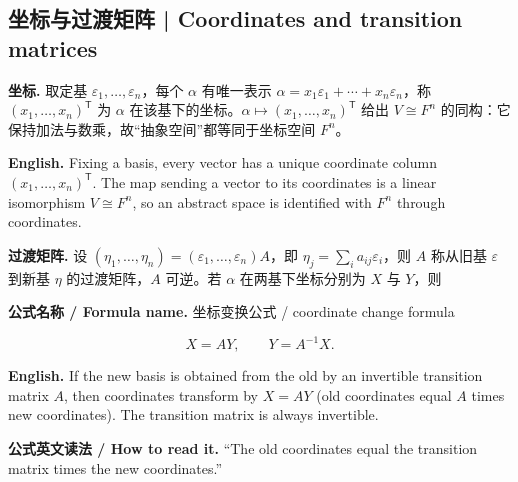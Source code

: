 \documentclass[UTF8,11pt,a4paper]{ctexart}
\newcommand{\EN}[1]{\par\noindent\textbf{English.} #1\par}
\newcommand{\READ}[1]{\par\noindent\textbf{公式英文读法 / How to read it.} #1\par}
\newcommand{\FORMULA}[2]{\par\noindent\textbf{公式名称 / Formula name.} #1 / #2\par}
\begin{document}
\subsection{坐标与过渡矩阵 | Coordinates and transition matrices}
\noindent\textbf{坐标.} 取定基 $\varepsilon_1,\dots,\varepsilon_n$，每个 $\alpha$ 有唯一表示 $\alpha=x_1\varepsilon_1+\cdots+x_n\varepsilon_n$，称 $(x_1,\dots,x_n)^{\mathsf T}$ 为 $\alpha$ 在该基下的坐标。$\alpha\mapsto(x_1,\dots,x_n)^{\mathsf T}$ 给出 $V\cong F^n$ 的同构：它保持加法与数乘，故“抽象空间”都等同于坐标空间 $F^n$。
\EN{Fixing a basis, every vector has a unique coordinate column $(x_1,\dots,x_n)^{\mathsf T}$. The map sending a vector to its coordinates is a linear isomorphism $V\cong F^n$, so an abstract space is identified with $F^n$ through coordinates.}
\noindent\textbf{过渡矩阵.} 设 $(\eta_1,\dots,\eta_n)=(\varepsilon_1,\dots,\varepsilon_n)A$，即 $\eta_j=\sum_i a_{ij}\varepsilon_i$，则 $A$ 称从旧基 $\varepsilon$ 到新基 $\eta$ 的过渡矩阵，$A$ 可逆。若 $\alpha$ 在两基下坐标分别为 $X$ 与 $Y$，则
\FORMULA{坐标变换公式}{coordinate change formula}
\[
X=AY,\qquad Y=A^{-1}X.
\]
\EN{If the new basis is obtained from the old by an invertible transition matrix $A$, then coordinates transform by $X=AY$ (old coordinates equal $A$ times new coordinates). The transition matrix is always invertible.}
\READ{``The old coordinates equal the transition matrix times the new coordinates.''}
\end{document}
